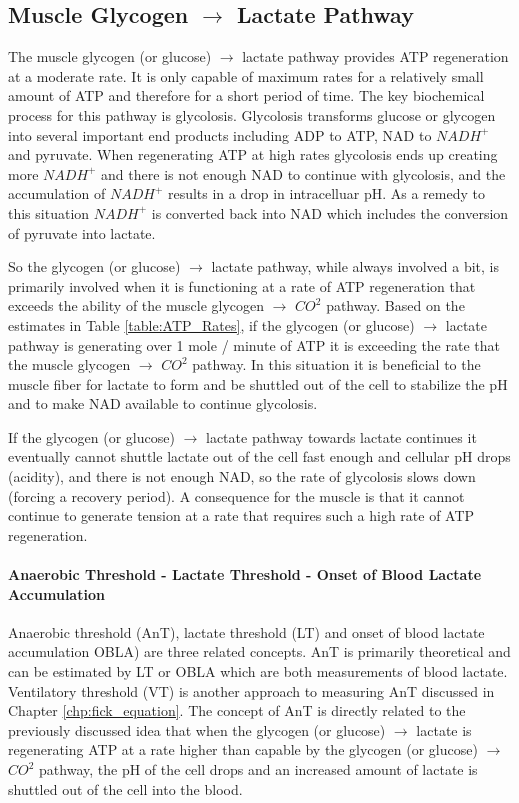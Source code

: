 \subsection{Muscle Glycogen $\rightarrow$ Lactate Pathway}

The muscle glycogen (or glucose) $\rightarrow$ lactate pathway provides ATP regeneration at a moderate rate. It is only capable of maximum rates for a relatively small amount of ATP and therefore for a short period of time. The key biochemical process for this pathway is glycolosis. 
Glycolosis transforms glucose or glycogen into several important end products including ADP to ATP, NAD to $NADH^+$ and pyruvate. When regenerating ATP at high rates glycolosis ends up creating more $NADH^+$ and there is not enough NAD to continue with glycolosis, and the accumulation of $NADH^+$ results in a drop in intracelluar pH. As a remedy to this situation $NADH^+$ is converted back into NAD which includes the conversion of pyruvate into lactate.

So the glycogen (or glucose) $\rightarrow$ lactate pathway, while always involved a bit, is primarily involved when it is functioning at a rate of ATP regeneration that exceeds the ability of the muscle glycogen $\rightarrow$ $CO^2$ pathway. Based on the estimates in Table \ref{table:ATP_Rates}, if the glycogen (or glucose) $\rightarrow$ lactate pathway is generating over 1 mole / minute of ATP it is exceeding the rate that the muscle glycogen $\rightarrow$ $CO^2$ pathway. In this situation it is beneficial to the muscle fiber for lactate to form and be shuttled out of the cell to stabilize the pH and to make NAD available to continue glycolosis. 

If the glycogen (or glucose) $\rightarrow$ lactate pathway towards lactate continues it eventually cannot shuttle lactate out of the cell fast enough and cellular pH drops (acidity), and there is not enough NAD, so the rate of glycolosis slows down (forcing a recovery period). A consequence for the muscle is that it cannot continue to generate tension at a rate that requires such a high rate of ATP regeneration.

\paragraph{Anaerobic Threshold - Lactate Threshold - Onset of Blood Lactate Accumulation}
Anaerobic threshold (AnT), lactate threshold (LT) and onset of blood lactate accumulation OBLA) are three related concepts. AnT is primarily theoretical and can be estimated by LT or OBLA which are both measurements of blood lactate. Ventilatory threshold (VT) is another approach to measuring AnT discussed in Chapter \ref{chp:fick_equation}. The concept of AnT is directly related to the previously discussed idea that when the glycogen (or glucose) $\rightarrow$ lactate is regenerating ATP at a rate higher than capable by the glycogen (or glucose) $\rightarrow$ $CO^2$ pathway, the pH of the cell drops and an increased amount of lactate is shuttled out of the cell into the blood.

